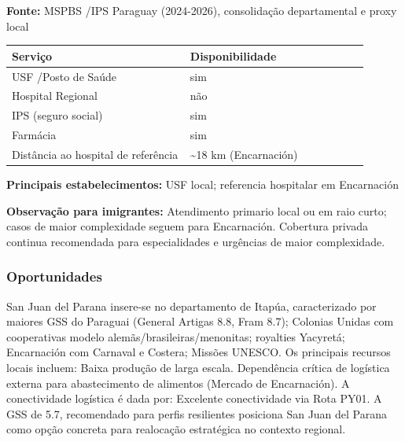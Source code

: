 \textbf{Fonte:} MSPBS /\allowbreak  IPS Paraguay (2024-2026), consolidação
departamental e proxy local

{\def\LTcaptype{none} %
\begin{longtable}{@{}>{\raggedright\arraybackslash}p{0.45\linewidth} >{\raggedright\arraybackslash}p{0.45\linewidth}@{}}
\toprule\noalign{}
Serviço & Disponibilidade \\
\midrule\noalign{}
\endhead
\bottomrule\noalign{}
\endlastfoot
USF /\allowbreak  Posto de Saúde & sim \\
Hospital Regional & não \\
IPS (seguro social) & sim \\
Farmácia & sim \\
Distância ao hospital de referência & \textasciitilde18 km
(Encarnación) \\
\end{longtable}
}

\textbf{Principais estabelecimentos:} USF local; referencia hospitalar
em Encarnación

\textbf{Observação para imigrantes:} Atendimento primario local ou em
raio curto; casos de maior complexidade seguem para Encarnación.
Cobertura privada continua recomendada para especialidades e urgências
de maior complexidade.
\newpage

\subsubsection*{Oportunidades}\label{oport-san-juan-del-parana-0728}
San Juan del Parana insere-se no departamento de Itapúa, caracterizado por maiores GSS do Paraguai (General Artigas 8.8, Fram 8.7); Colonias Unidas com cooperativas modelo alemãs/brasileiras/menonitas; royalties Yacyretá; Encarnación com Carnaval e Costera; Missões UNESCO. Os principais recursos locais incluem: Baixa produção de larga escala. Dependência crítica de logística externa para abastecimento de alimentos (Mercado de Encarnación). A conectividade logística é dada por: Excelente conectividade via Rota PY01. A GSS de 5.7, recomendado para perfis resilientes posiciona San Juan del Parana como opção concreta para realocação estratégica no contexto regional.

